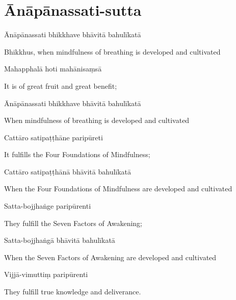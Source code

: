 \section{Ānāpānassati-sutta}


\begin{leader}
\end{leader}

Ānāpānassati bhikkhave bhāvitā bahulīkatā

\begin{english}
  Bhikkhus, when mindfulness of breathing is developed and cultivated
\end{english}

Mahapphalā hoti mahānisaṃsā

\begin{english}
  It is of great fruit and great benefit;
\end{english}

Ānāpānassati bhikkhave bhāvitā bahulīkatā

\begin{english}
  When mindfulness of breathing is developed and cultivated
\end{english}

Cattāro satipaṭṭhāne paripūreti

\begin{english}
  It fulfills the Four Foundations of Mindfulness;
\end{english}

Cattāro satipaṭṭhānā bhāvitā bahulīkatā

\begin{english}
  When the Four Foundations of Mindfulness are developed and cultivated
\end{english}

Satta-bojjhaṅge paripūrenti

\begin{english}
  They fulfill the Seven Factors of Awakening;
\end{english}

Satta-bojjhaṅgā bhāvitā bahulīkatā

\begin{english}
  When the Seven Factors of Awakening are developed and cultivated
\end{english}

Vijjā-vimuttiṃ paripūrenti

\begin{english}
  They fulfill true knowledge and deliverance.
\end{english}

